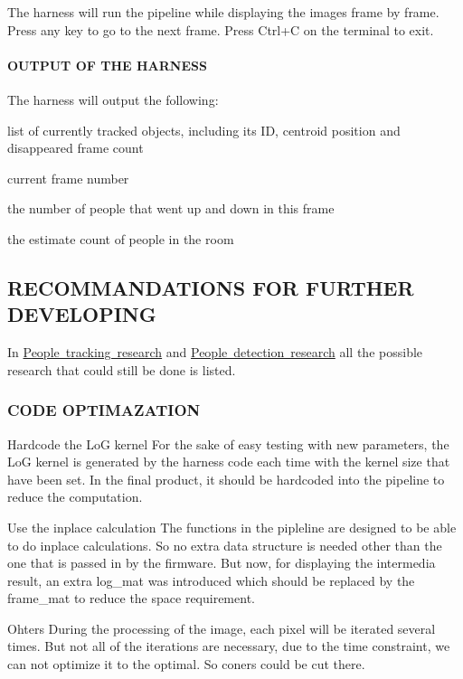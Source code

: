 The harness will run the pipeline while displaying the images frame by frame. Press any key to go to the next frame. Press Ctrl+C on the terminal to exit.

\paragraph*{O\+U\+T\+P\+UT OF T\+HE H\+A\+R\+N\+E\+SS}

The harness will output the following\+:
\begin{DoxyItemize}
\item list of currently tracked objects, including its ID, centroid position and disappeared frame count
\item current frame number
\item the number of people that went up and down in this frame
\item the estimate count of people in the room
\end{DoxyItemize}

\subsection*{R\+E\+C\+O\+M\+M\+A\+N\+D\+A\+T\+I\+O\+NS F\+OR F\+U\+R\+T\+H\+ER D\+E\+V\+E\+L\+O\+P\+I\+NG}

In \mbox{\hyperlink{tracking_research}{People tracking research}} and \mbox{\hyperlink{detection_research}{People detection research}} all the possible research that could still be done is listed.

\subsubsection*{C\+O\+DE O\+P\+T\+I\+M\+A\+Z\+A\+T\+I\+ON}


\begin{DoxyEnumerate}
\item Hardcode the LoG kernel For the sake of easy testing with new parameters, the LoG kernel is generated by the harness code each time with the kernel size that have been set. In the final product, it should be hardcoded into the pipeline to reduce the computation.
\item Use the inplace calculation The functions in the pipleline are designed to be able to do inplace calculations. So no extra data structure is needed other than the one that is passed in by the firmware. But now, for displaying the intermedia result, an extra log\+\_\+mat was introduced which should be replaced by the frame\+\_\+mat to reduce the space requirement.
\item Ohters During the processing of the image, each pixel will be iterated several times. But not all of the iterations are necessary, due to the time constraint, we can not optimize it to the optimal. So coners could be cut there.
\end{DoxyEnumerate}

